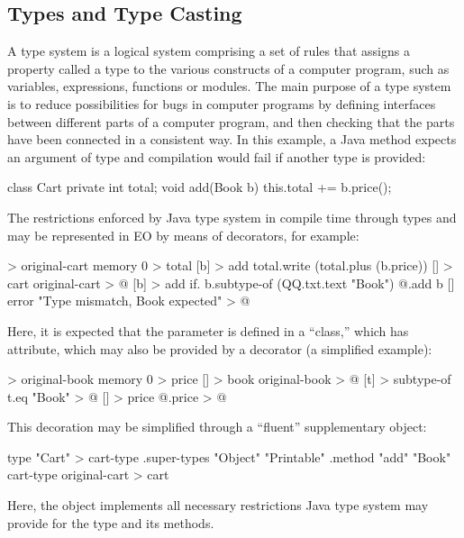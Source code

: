 \documentclass[sigplan,11pt,nonacm,natbib=false]{acmart}
\begin{document}
\subsection{Types and Type Casting}
\label{sec:types}

A type system is a logical system comprising a set of rules that assigns a property called a type to the various constructs of a computer program, such as variables, expressions, functions or modules. The main purpose of a type system is to reduce possibilities for bugs in computer programs by defining interfaces between different parts of a computer program, and then checking that the parts have been connected in a consistent way. In this example, a Java method  expects an argument of type  and compilation would fail if another type is provided:

\begin{ffcode}
class Cart {
  private int total;
  void add(Book b) {
    this.total += b.price();
  }
}
\end{ffcode}

The restrictions enforced by Java type system in compile time through types  and  may be represented in EO by means of decorators, for example:

\begin{ffcode}
[] > original-cart
  memory 0 > total
  [b] > add
    total.write (total.plus (b.price))
[] > cart
  original-cart > @
  [b] > add
    if.
      b.subtype-of (QQ.txt.text "Book")
      @.add b
      []
        error "Type mismatch, Book expected" > @
\end{ffcode}

Here, it is expected that the parameter  is defined in a ``class,'' which has  attribute, which may also be provided by a decorator (a simplified example):

\begin{ffcode}
[] > original-book
  memory 0 > price
[] > book
  original-book > @
  [t] > subtype-of
    t.eq "Book" > @
  [] > price
    @.price > @
\end{ffcode}

This decoration may be simplified through a ``fluent'' supplementary object:

\begin{ffcode}
type "Cart" > cart-type
.super-types "Object" "Printable"
.method "add" "Book"
cart-type original-cart > cart
\end{ffcode}

Here, the  object implements all necessary restrictions Java type system may provide for the type  and its methods.
\end{document}
